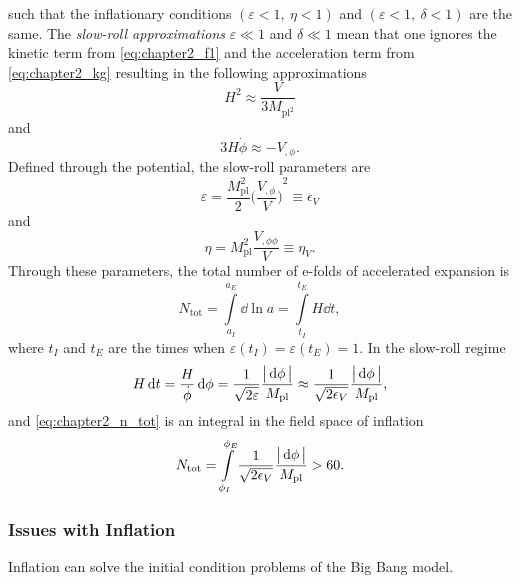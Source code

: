 %
such that the inflationary conditions \((\varepsilon<1,\ \eta<1)\) and \((\varepsilon<1,\ \delta<1)\) are the same.
The \emph{slow-roll approximations} \(\varepsilon \ll 1\) and \(\delta \ll 1\) mean that one ignores the kinetic term from \cref{eq:chapter2_f1} and the acceleration term from \cref{eq:chapter2_kg} resulting in the following approximations
%
\begin{equation}
	H^{2}
	\approx \frac{V}{3M_{\text{pl}^{2}}}
\end{equation}
%
and
%
\begin{equation}
	3H\dot{\phi}
	\approx -V_{,\phi}.
\end{equation}
%
Defined through the potential, the slow-roll parameters are
%
\begin{equation}
	\varepsilon
	= \frac{M_{\text{pl}}^{2}}{2} {\bigg(\frac{V_{,\phi}}{V}\bigg)}^{2} \equiv \epsilon_{V}
\end{equation}
%
and
%
\begin{equation}
	\eta
	= M_{\text{pl}}^{2} \frac{V_{,\phi\phi}}{V} \equiv \eta_{V}.
\end{equation}
%
%
Through these parameters, the total number of e-folds of accelerated expansion is
%
\begin{equation}\label{eq:chapter2_n_tot}
	N_{\text{tot}}
	= \int\limits_{a_{I}}^{a_{E}} \dd{\ln{a}}
	= \int\limits_{t_{I}}^{t_{E}} H \dd{t},
\end{equation}
%
where \(t_{I}\) and \(t_{E}\) are the times when \(\varepsilon(t_{I}) = \varepsilon(t_{E}) = 1\).
In the slow-roll regime
%
\begin{equation}
	H \dd{t}
	= \frac{H}{\dot{\phi}} \dd{\phi}
	= \frac{1}{\sqrt{2\varepsilon}} \frac{\big\lvert\dd{\phi}\big\rvert}{M_{\text{pl}}}
	\approx \frac{1}{\sqrt{2\epsilon_{V}}} \frac{\big\lvert\dd{\phi}\big\rvert}{M_{\text{pl}}},
\end{equation}
%
and \cref{eq:chapter2_n_tot} is an integral in the field space of inflation
%
\begin{equation}
	N_{\text{tot}}
	= \int\limits_{\phi_{I}}^{\phi_{E}}  \frac{1}{\sqrt{2\epsilon_{V}}} \frac{\big\lvert\dd{\phi}\big\rvert}{M_{\text{pl}}}
	> 60.
\end{equation}

\subsubsection{Issues with Inflation}

Inflation can solve the initial condition problems of the Big Bang model.

